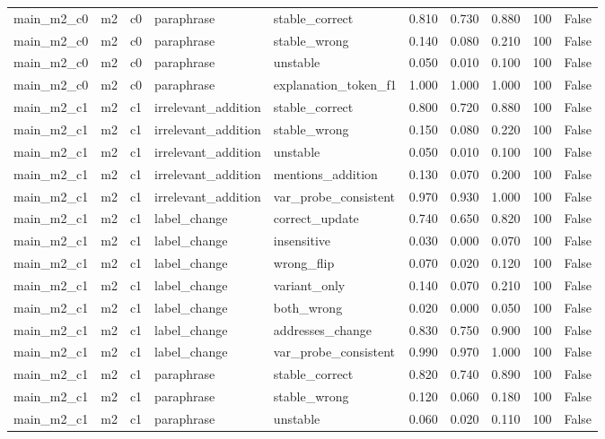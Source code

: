 \begin{tabular}{llllllllll}
main\_m2\_c0 & m2 & c0 & paraphrase & stable\_correct & 0.810 & 0.730 & 0.880 & 100 & False \\
main\_m2\_c0 & m2 & c0 & paraphrase & stable\_wrong & 0.140 & 0.080 & 0.210 & 100 & False \\
main\_m2\_c0 & m2 & c0 & paraphrase & unstable & 0.050 & 0.010 & 0.100 & 100 & False \\
main\_m2\_c0 & m2 & c0 & paraphrase & explanation\_token\_f1 & 1.000 & 1.000 & 1.000 & 100 & False \\
main\_m2\_c1 & m2 & c1 & irrelevant\_addition & stable\_correct & 0.800 & 0.720 & 0.880 & 100 & False \\
main\_m2\_c1 & m2 & c1 & irrelevant\_addition & stable\_wrong & 0.150 & 0.080 & 0.220 & 100 & False \\
main\_m2\_c1 & m2 & c1 & irrelevant\_addition & unstable & 0.050 & 0.010 & 0.100 & 100 & False \\
main\_m2\_c1 & m2 & c1 & irrelevant\_addition & mentions\_addition & 0.130 & 0.070 & 0.200 & 100 & False \\
main\_m2\_c1 & m2 & c1 & irrelevant\_addition & var\_probe\_consistent & 0.970 & 0.930 & 1.000 & 100 & False \\
main\_m2\_c1 & m2 & c1 & label\_change & correct\_update & 0.740 & 0.650 & 0.820 & 100 & False \\
main\_m2\_c1 & m2 & c1 & label\_change & insensitive & 0.030 & 0.000 & 0.070 & 100 & False \\
main\_m2\_c1 & m2 & c1 & label\_change & wrong\_flip & 0.070 & 0.020 & 0.120 & 100 & False \\
main\_m2\_c1 & m2 & c1 & label\_change & variant\_only & 0.140 & 0.070 & 0.210 & 100 & False \\
main\_m2\_c1 & m2 & c1 & label\_change & both\_wrong & 0.020 & 0.000 & 0.050 & 100 & False \\
main\_m2\_c1 & m2 & c1 & label\_change & addresses\_change & 0.830 & 0.750 & 0.900 & 100 & False \\
main\_m2\_c1 & m2 & c1 & label\_change & var\_probe\_consistent & 0.990 & 0.970 & 1.000 & 100 & False \\
main\_m2\_c1 & m2 & c1 & paraphrase & stable\_correct & 0.820 & 0.740 & 0.890 & 100 & False \\
main\_m2\_c1 & m2 & c1 & paraphrase & stable\_wrong & 0.120 & 0.060 & 0.180 & 100 & False \\
main\_m2\_c1 & m2 & c1 & paraphrase & unstable & 0.060 & 0.020 & 0.110 & 100 & False \\

\end{tabular}
